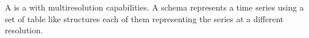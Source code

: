 A  is a  with multiresolution capabilities.  A
 schema represents a time series using a set of table like
structures each of them representing the series at a different
resolution.




%   


%   



